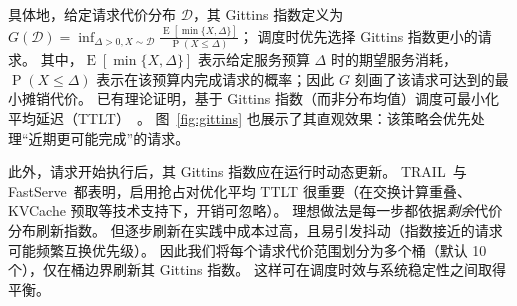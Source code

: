 具体地，给定请求代价分布 $\mathcal{D}$，其 Gittins 指数定义为
$G(\mathcal{D})=\operatorname*{inf}_{\Delta>0,X\sim\mathcal{D}}{\frac{\operatorname{E}[\operatorname*{min}\{X,\Delta\}]}{\operatorname*{P}(X\leq\Delta)}}$；
调度时优先选择 Gittins 指数更小的请求。
其中，$\operatorname{E}[\operatorname*{min}\{X,\Delta\}]$ 表示给定服务预算 $\Delta$ 时的期望服务消耗，$\operatorname*{P}(X\leq\Delta)$ 表示在该预算内完成请求的概率；因此 $G$ 刻画了该请求可达到的最小摊销代价。
已有理论证明，基于 Gittins 指数（而非分布均值）调度可最小化平均延迟（TTLT）~\cite{gittins1989multiprocessor}。
图~\ref{fig:gittins} 也展示了其直观效果：该策略会优先处理“近期更可能完成”的请求。

此外，请求开始执行后，其 Gittins 指数应在运行时动态更新。
TRAIL~\cite{shahout2024don}与 FastServe~\cite{wu2023fast}都表明，启用抢占对优化平均 TTLT 很重要（在交换计算重叠、KVCache 预取等技术支持下，开销可忽略）。
理想做法是每一步都依据\emph{剩余}代价分布刷新指数。
但逐步刷新在实践中成本过高，且易引发抖动（指数接近的请求可能频繁互换优先级）。
因此我们将每个请求代价范围划分为多个桶（默认 10 个），仅在桶边界刷新其 Gittins 指数。
这样可在调度时效与系统稳定性之间取得平衡。

